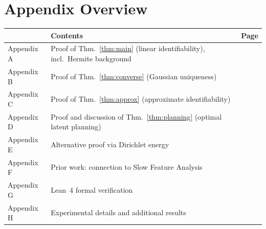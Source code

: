  
\section*{Appendix Overview}

\begin{center}
\renewcommand{\arraystretch}{1.15}
\begin{tabular}{lll}
\toprule
& \textbf{Contents} & \textbf{Page} \\
\midrule
Appendix A & Proof of Thm.~\ref{thm:main} (linear identifiability), incl.\ Hermite background & \pageref{app:proof-forward} \\
Appendix B & Proof of Thm.~\ref{thm:converse} (Gaussian uniqueness) & \pageref{app:converse-proof} \\
Appendix C & Proof of Thm.~\ref{thm:approx} (approximate identifiability) & \pageref{app:stability} \\
Appendix D & Proof and discussion of Thm.~\ref{thm:planning} (optimal latent planning) & \pageref{app:planning} \\
Appendix E & Alternative proof via Dirichlet energy & \pageref{app:dirichlet} \\
Appendix F & Prior work: connection to Slow Feature Analysis & \pageref{app:prior-work} \\
Appendix G & Lean~4 formal verification & \pageref{app:lean} \\
Appendix H & Experimental details and additional results & \pageref{app:experiment} \\
\bottomrule
\end{tabular}
\end{center}

